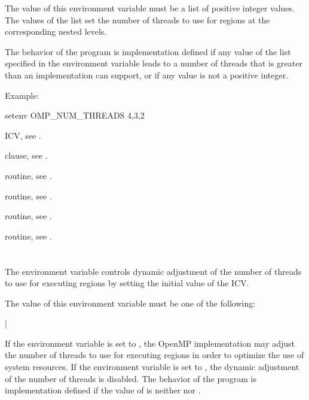 The value of this environment variable must be a list of positive integer
values. The values of the list set the number of threads to use for
 regions at the corresponding nested levels.

The behavior of the program is implementation defined if any value of the
list specified in the  environment variable leads to
a number of threads that is greater than an implementation can support, or
if any value is not a positive integer.

Example:
\begin{ompEnv}
setenv OMP_NUM_THREADS 4,3,2
\end{ompEnv}

\begin{crossrefs}
\item {} ICV, see .

\item {} clause, see .

\item {} routine, see .

\item {} routine, see .

\item {} routine, see .

\item {} routine, see .
\end{crossrefs}



\section{}
\label{sec:OMP_DYNAMIC}
The  environment variable controls dynamic adjustment
of the number of threads to use for executing  regions by
setting the initial value of the  ICV.

The value of this environment variable must be one of the following:

{|}

If the environment variable is set to , the OpenMP implementation
may adjust the number of threads to use for executing  regions
in order to optimize the use of system resources. If the environment variable
is set to , the dynamic adjustment of the number of threads is
disabled. The behavior of the program is implementation defined if the value
of  is neither  nor .

